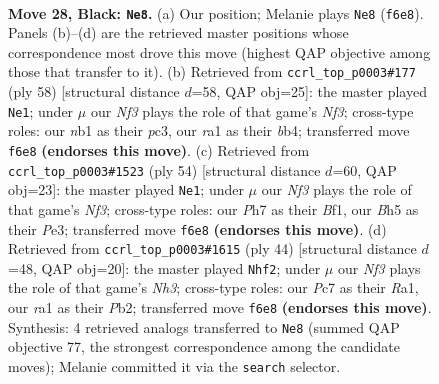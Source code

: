 \documentclass[11pt]{article}
\begin{document}
\clearpage

\begin{figure}[p]\centering
\begin{subfigure}{0.46\textwidth}\centering
\resizebox{\linewidth}{!}{%
\newchessgame
\chessboard[
  setfen={1r4k1/2p2p1p/p1P2np1/4pn1b/8/P7/2B3P1/RNB3K1 b - - 1 28},
  showmover=false,
  pgfstyle=straightmove, color=movearrow, markmove={f6-e8}
]}
\caption{}
\end{subfigure}\hfill
\begin{subfigure}{0.46\textwidth}\centering
\resizebox{\linewidth}{!}{%
\newchessgame
\chessboard[
  setfen={6k1/r2n1ppp/4p3/1B6/1b1PP3/2p2NP1/5P1P/2R3K1 w - - 2 30},
  showmover=false,
  pgfstyle=straightmove, color=movearrow, markmove={f3-e1}
]}
\caption{}
\end{subfigure}
\\[4pt]
\begin{subfigure}{0.46\textwidth}\centering
\resizebox{\linewidth}{!}{%
\newchessgame
\chessboard[
  setfen={1nr3k1/p2b1ppp/3b4/B2p4/3P4/4PNP1/1R3P1P/5BK1 w - - 1 28},
  showmover=false,
  pgfstyle=straightmove, color=movearrow, markmove={f3-e1}
]}
\caption{}
\end{subfigure}\hfill
\begin{subfigure}{0.46\textwidth}\centering
\resizebox{\linewidth}{!}{%
\newchessgame
\chessboard[
  setfen={1nbr2k1/8/p3p2p/1p2b3/4N3/2P4N/PP4PP/R4BK1 w - - 2 23},
  showmover=false,
  pgfstyle=straightmove, color=movearrow, markmove={h3-f2}
]}
\caption{}
\end{subfigure}
\caption{\textbf{Move 28, Black: \texttt{Ne8}.} (a) Our position; Melanie plays \texttt{Ne8} (\texttt{f6e8}). Panels (b)--(d) are the retrieved master positions whose correspondence most drove this move (highest QAP objective among those that transfer to it). (b) Retrieved from \texttt{ccrl\_top\_p0003\#177} (ply 58) [structural distance $d$=58, QAP obj=25]: the master played \texttt{Ne1}; under $\mu$ our \emph{Nf3} plays the role of that game's \emph{Nf3}; cross-type roles: our \emph{n}b1 as their \emph{p}c3, our \emph{r}a1 as their \emph{b}b4; transferred move \texttt{f6e8} \textbf{(endorses this move)}. (c) Retrieved from \texttt{ccrl\_top\_p0003\#1523} (ply 54) [structural distance $d$=60, QAP obj=23]: the master played \texttt{Ne1}; under $\mu$ our \emph{Nf3} plays the role of that game's \emph{Nf3}; cross-type roles: our \emph{P}h7 as their \emph{B}f1, our \emph{B}h5 as their \emph{P}e3; transferred move \texttt{f6e8} \textbf{(endorses this move)}. (d) Retrieved from \texttt{ccrl\_top\_p0003\#1615} (ply 44) [structural distance $d$=48, QAP obj=20]: the master played \texttt{Nhf2}; under $\mu$ our \emph{Nf3} plays the role of that game's \emph{Nh3}; cross-type roles: our \emph{P}c7 as their \emph{R}a1, our \emph{r}a1 as their \emph{P}b2; transferred move \texttt{f6e8} \textbf{(endorses this move)}. Synthesis: 4 retrieved analogs transferred to \texttt{Ne8} (summed QAP objective 77, the strongest correspondence among the candidate moves); Melanie committed it via the \texttt{search} selector.}
\label{fig:thought-m55}
\end{figure}
\end{document}
